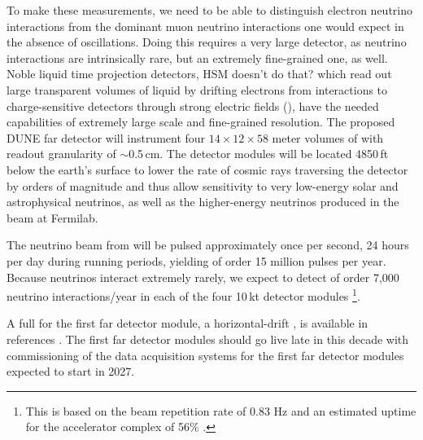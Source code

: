 \documentclass[../main-v1.tex]{subfiles}
\begin{document}
To make these measurements, we need to be able to distinguish %
electron neutrino interactions  from the dominant muon neutrino interactions one would expect in the absence of oscillations.  %
Doing this requires a very large detector, as neutrino interactions are intrinsically rare, but an extremely  fine-grained one, as well.  Noble liquid  time projection detectors,  HSM doesn't  do that? 
which read out large transparent volumes of liquid by drifting electrons from interactions to charge-sensitive detectors through strong electric fields (), have the needed capabilities of extremely large scale and fine-grained resolution. The proposed DUNE far detector will instrument four  $14\times12 \times58$ meter volumes of  with readout granularity of $\sim$0.5\,cm.  The detector modules will be located 4850\,ft below the earth's surface to lower the rate of cosmic rays traversing the detector by orders of magnitude and thus allow sensitivity to very low-energy solar and astrophysical neutrinos, as well as the higher-energy neutrinos produced in the beam at Fermilab.  %



The neutrino beam from  will be pulsed approximately once per second, 24 hours per day during running periods, %
yielding of order 15 million pulses per year.  Because neutrinos interact  extremely rarely, we expect to detect of order 7,000 neutrino interactions/year in each of the four 10\,kt detector modules%
\footnote{This is based on the beam repetition rate of 0.83 Hz and an estimated uptime for the accelerator complex of 56\% \cite{Abi:2020evt}.}.


A full  for the first far detector module, a horizontal-drift ,
is available in references%
\cite{DUNE:2020lwj, Abi:2020evt, Abi:2020oxb, Abi:2020loh}.
The first far detector modules should go live late in this decade with commissioning of the data acquisition systems for the first far detector modules expected to start in 2027. %
\end{document}
